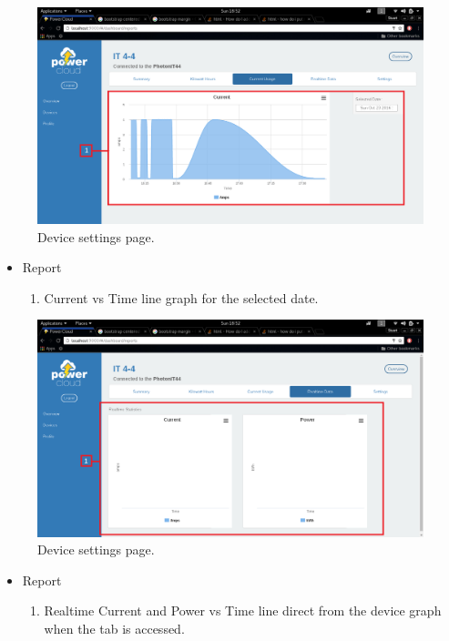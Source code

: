 \documentclass[a4paper,10pt]{article}
\begin{document}
		\begin{figure}[H]
			\includegraphics[width=\textwidth]{images/Reports_CurrentLine.png}
			\caption{Device settings page. \label{overflow}}
		\end{figure}
		\begin{itemize}
			\item Report
			\begin{enumerate}
				\item Current vs Time line graph for the selected date.
			\end{enumerate}
		\end{itemize}
		
		\begin{figure}[H]
			\includegraphics[width=\textwidth]{images/Reports_RealtimeLines.png}
			\caption{Device settings page. \label{overflow}}
		\end{figure}
		\begin{itemize}
			\item Report
			\begin{enumerate}
				\item Realtime Current and Power vs Time line direct from the device graph when the tab is accessed.
			\end{enumerate}
		\end{itemize}
		
\end{document}
